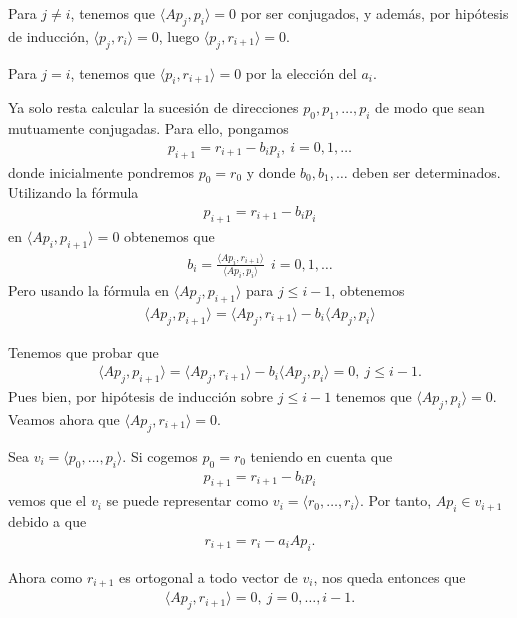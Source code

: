 Para $j\neq i$, tenemos que $\langle{Ap_j, p_i\rangle}=0$ por ser conjugados, y además, por hipótesis de inducción, $\langle{p_j, r_i\rangle}=0$, luego $\langle{p_j, r_{i+1}\rangle}=0$.

Para $j=i$, tenemos que $\langle{p_i, r_{i+1}\rangle}=0$ por la elección del $a_i$.

Ya solo resta calcular la sucesión de direcciones $p_0, p_1, \ldots, p_i$ de modo que sean mutuamente conjugadas. Para ello, pongamos \begin{gather*}p_{i+1}=r_{i+1}-b_ip_i,\ i=0, 1, \ldots\end{gather*}
donde inicialmente pondremos $p_0=r_0$ y donde $b_0, b_1, \ldots$ deben ser determinados. Utilizando la fórmula
\begin{gather*}p_{i+1}=r_{i+1}-b_ip_i\end{gather*}
en $\langle{Ap_i, p_{i+1}\rangle}=0$ obtenemos que
\begin{gather*}b_i=\frac{\langle{Ap_i, r_{i+1}\rangle}}{\langle{Ap_i,p_i\rangle}}\ \ i=0, 1, \ldots\end{gather*}
Pero usando la fórmula en $\langle{Ap_j, p_{i+1}\rangle}$ para $j\leq i-1$, obtenemos
\begin{gather*}\langle{Ap_j, p_{i+1}\rangle}=\langle{Ap_j, r_{i+1}\rangle}-b_i\langle{Ap_j, p_i\rangle}\end{gather*}

Tenemos que probar que
\begin{gather*}\langle{Ap_j, p_{i+1}\rangle}=\langle{Ap_j, r_{i+1}\rangle}-b_i\langle{Ap_j, p_i\rangle}=0,\ j\leq i-1.\end{gather*}
Pues bien, por hipótesis de inducción sobre $j\leq i-1$ tenemos que $\langle{Ap_j, p_i\rangle}=0$. Veamos ahora que $\langle{Ap_j, r_{i+1}\rangle}=0$.

Sea $v_i=\langle{p_0, \ldots, p_i\rangle}$. Si cogemos $p_0=r_0$ teniendo en cuenta que
\begin{gather*}p_{i+1}=r_{i+1}-b_ip_i\end{gather*}
vemos que el $v_i$ se puede representar como $v_i=\langle{r_0, \ldots, r_i\rangle}$. Por tanto, $Ap_i\in v_{i+1}$ debido a que \begin{gather*}r_{i+1}=r_i-a_iAp_i.\end{gather*}

Ahora como $r_{i+1}$ es ortogonal a todo vector de $v_i$, nos queda entonces que
\begin{gather*}\langle{Ap_j, r_{i+1}\rangle}=0,\ j=0, \ldots, i-1.\end{gather*}

